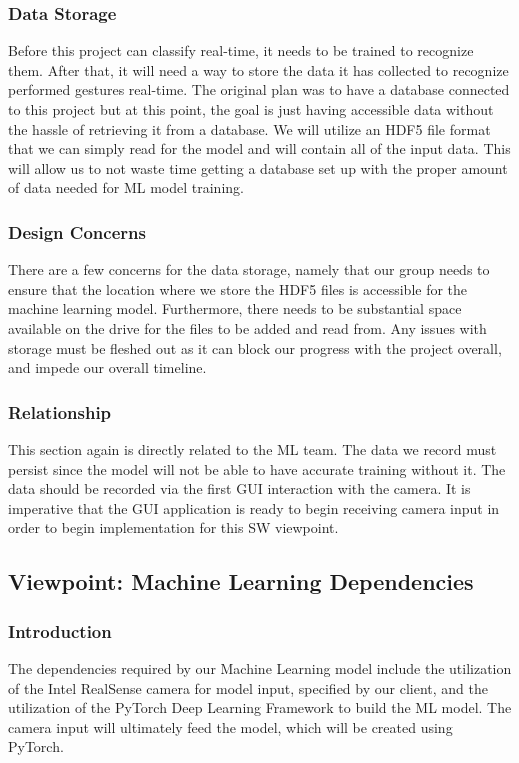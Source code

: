 \documentclass[onecolumn, draftclsnofoot,10pt, compsoc]{IEEEtran}
\begin{document}
\subsubsection{Data Storage}
Before this project can classify real-time, it needs to be trained to recognize them.  After that, it will need a way to store the data it has collected to recognize performed gestures real-time. The original plan was to have a database connected to this project but at this point, the goal is just having accessible data without the hassle of retrieving it from a database. We will utilize an HDF5 file format that we can simply read for the model and will contain all of the input data. This will allow us to not waste time getting a database set up with the proper amount of data needed for ML model training.

\subsubsection{Design Concerns}
There are a few concerns for the data storage, namely that our group needs to ensure that the location where we store the HDF5 files is accessible for the machine learning model. Furthermore, there needs to be substantial space available on the drive for the files to be added and read from. Any issues with storage must be fleshed out as it can block our progress with the project overall, and impede our overall timeline.

\subsubsection{Relationship}
This section again is directly related to the ML team. The data we record must persist since the model will not be able to have accurate training without it. The data should be recorded via the first GUI interaction with the camera. It is imperative that the GUI application is ready to begin receiving camera input in order to begin implementation for this SW viewpoint.

\subsection{Viewpoint: Machine Learning Dependencies}
\subsubsection{Introduction}
The dependencies required by our Machine Learning model include the utilization of the Intel RealSense camera for model input, specified by our client, and the utilization of the PyTorch Deep Learning Framework to build the ML model. The camera input will ultimately feed the model, which will be created using PyTorch.
\end{document}
